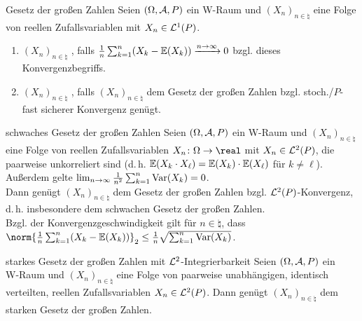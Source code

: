 \linie

\begin{Def}{Gesetz der großen Zahlen}
    Seien $(\Omega, \mathcal{A}, P)$ ein W-Raum und $(X_n)_{n \in \natural}$ eine Folge von reellen
    Zufallsvariablen mit $X_n \in \mathcal{L}^1(P)$.
    \begin{enumerate}
        \item
        $(X_n)_{n \in \natural}$ , falls
        $\frac{1}{n} \sum_{k=1}^n (X_k - \mathbb{E}(X_k)) \xrightarrow{n \to \infty} 0$
        bzgl. dieses Konvergenzbegriffs.

        \item
        $(X_n)_{n \in \natural}$ ,
        falls $(X_n)_{n \in \natural}$ dem Gesetz der großen Zahlen bzgl.
        stoch./$P$-fast sicherer Konvergenz genügt.
    \end{enumerate}
\end{Def}

\begin{Satz}{schwaches Gesetz der großen Zahlen}
    Seien $(\Omega, \mathcal{A}, P)$ ein W-Raum und $(X_n)_{n \in \natural}$ eine Folge von
    reellen Zufallsvariablen $X_n\colon \Omega \rightarrow \real$ mit $X_n \in \mathcal{L}^2(P)$,
    die paarweise unkorreliert sind (d.\,h. $\mathbb{E}(X_k \cdot X_\ell) = \mathbb{E}(X_k) \cdot \mathbb{E}(X_\ell)$
    für $k \not= \ell$).
    Außerdem gelte $\lim_{n \to \infty} \frac{1}{n^2} \sum_{k=1}^n \text{Var}(X_k) = 0$.\\
    Dann genügt $(X_n)_{n \in \natural}$ dem Gesetz der großen Zahlen bzgl. $\mathcal{L}^2(P)$-Konvergenz,
    d.\,h. insbesondere dem schwachen Gesetz der großen Zahlen.\\
    Bzgl. der Konvergenzgeschwindigkeit gilt für $n \in \natural$, dass\\
    $\norm{\frac{1}{n} \sum_{k=1}^n (X_k - \EW(X_k))}_2 \le
    \frac{1}{n} \sqrt{\sum_{k=1}^n \Var(X_k)}$.
\end{Satz}

\linie

\begin{Satz}{starkes Gesetz der großen Zahlen mit $\mathcal{L}^2$-Integrierbarkeit}
    Seien $(\Omega, \mathcal{A}, P)$ ein\\
    W-Raum und $(X_n)_{n \in \natural}$
    eine Folge von paarweise unabhängigen, identisch verteilten, reellen Zufallsvariablen
    $X_n \in \mathcal{L}^2(P)$.
    Dann genügt $(X_n)_{n \in \natural}$ dem starken Gesetz der großen Zahlen.
\end{Satz}

